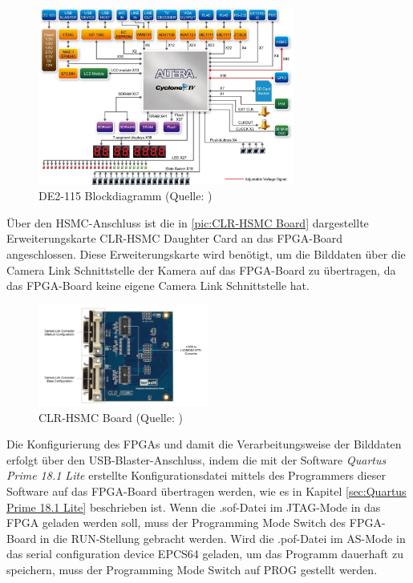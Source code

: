 \documentclass[ngerman,12pt]{article} %
\begin{document}
{\begin{figure} [h!tb]%
	\begin{center}
	\includegraphics[width=0.75\textwidth]{DE2-115 Blockdiagramm}
	\caption[DE2-115 Blockdiagramm]{\label{pic:DE2-115 Blockdiagramm}DE2-115 Blockdiagramm (Quelle: \cite{Terasic b})}
	\end{center}
\end{figure}

Über den HSMC-Anschluss ist die in \autoref{pic:CLR-HSMC Board} dargestellte Erweiterungskarte CLR-HSMC Daughter Card an das FPGA-Board angeschlossen. Diese Erweiterungskarte wird benötigt, um die Bilddaten über die Camera Link Schnittstelle der Kamera auf das FPGA-Board zu übertragen, da das FPGA-Board keine eigene Camera Link Schnittstelle hat. 

\begin{figure} [h!tb]%
	\begin{center}
	\includegraphics[width=0.5\textwidth]{CLR_HSMC_Oberseite}
	\caption[CLR-HSMC Board]{\label{pic:CLR-HSMC Board}CLR-HSMC Board (Quelle: \cite{Terasic b})}
	\end{center}
\end{figure}

Die Konfigurierung des FPGAs und damit die Verarbeitungsweise der Bilddaten erfolgt über den USB-Blaster-Anschluss, indem die mit der Software \textit{Quartus Prime 18.1 Lite} erstellte Konfigurationsdatei mittels des Programmers dieser Software auf das FPGA-Board übertragen werden, wie es in Kapitel \ref{sec:Quartus Prime 18.1 Lite} beschrieben ist. Wenn die .sof-Datei im JTAG-Mode in das FPGA geladen werden soll, muss der Programming Mode Switch des FPGA-Board in die RUN-Stellung gebracht werden. Wird die .pof-Datei im AS-Mode in das serial configuration device EPCS64 geladen, um das Programm dauerhaft zu speichern, muss der Programming Mode Switch auf PROG gestellt werden\cite{Terasic b}.
\clearpage





}
\end{document}
